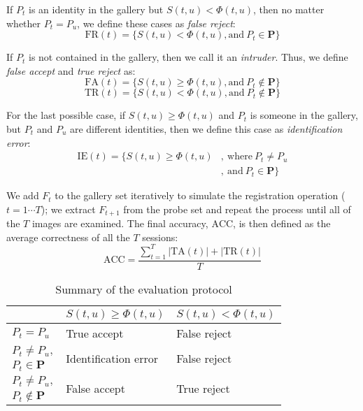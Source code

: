 \documentclass[10pt,twocolumn]{article}
\begin{document}
If $P_{t}$ is an identity in the gallery but $S(t,u) < \Phi(t,u)$, then no matter whether $P_{t}=P_{u}$, we define these cases as \textit{false reject}:
\begin{equation}
\mathrm{FR}(t) = \{S(t,u) < \Phi(t,u), \mathrm{and} \: P_{t} \in \textbf{P} \}
\end{equation}

If $P_{t}$ is not contained in the gallery, then we call it an \textit{intruder}. Thus, we define \textit{false accept} and \textit{true reject} as:
\begin{equation}
\mathrm{FA}(t) = \{S(t,u) \geq \Phi(t,u), \mathrm{and} \: P_{t} \notin \textbf{P} \}
\end{equation}
\begin{equation}
\mathrm{TR}(t) = \{S(t,u) < \Phi(t,u), \mathrm{and} \: P_{t} \notin \textbf{P} \}
\end{equation}

For the last possible case, if $S(t,u) \geq \Phi(t,u)$ and $P_{t}$ is someone in the gallery, but $P_{t}$ and $P_{u}$ are different identities, then we define this case as \textit{identification error}:
\begin{equation}
\begin{aligned}
    \mathrm{IE}(t) = \{S(t,u) \geq \Phi(t,u)
    &,~\mathrm{where}~P_{t} \neq P_{u} \\ &,~\mathrm{and}~P_{t} \in \textbf{P} \}
\end{aligned}
\end{equation}

We add $F_{t}$ to the gallery set iteratively to simulate the registration operation ($t=1\cdots T$); we extract $F_{t+1}$ from the probe set and repeat the process until all of the $T$ images are examined. The final accuracy, $\mathrm{ACC}$, 
is then defined as the average correctness of all the $T$ sessions:
\begin{equation}
\label{ACC}
\mathrm{ACC}=\frac{\sum_{t=1}^T |\mathrm{TA}(t)|+|\mathrm{TR}(t)|}{T}
\end{equation}

\begin{table}[ht]
\centering
\vspace{-10pt}
\caption{Summary of the evaluation protocol}
\label{tab:evaluation-protocol}
\begin{tabular}{lll}
\toprule
& $S(t,u) \geq \Phi(t,u)$
& $S(t,u) < \Phi(t,u)$   \\ \midrule
$P_{t}=P_{u}$        & True accept &  False reject \\ \midrule
$P_{t} \neq P_{u},$  & \multirow{2}{8em}{Identification error}  &  \multirow{2}{5em}{False reject} \\
$P_{t} \in \textbf{P}$ &  &  \\ \midrule
$P_{t} \neq P_{u},$  & \multirow{2}{8em}{False accept }  &  \multirow{2}{5em}{True reject} \\
$P_{t} \notin \textbf{P}$ &  &  \\ \midrule
\end{tabular}
\end{table}
\vspace{-10pt}
\end{document}
